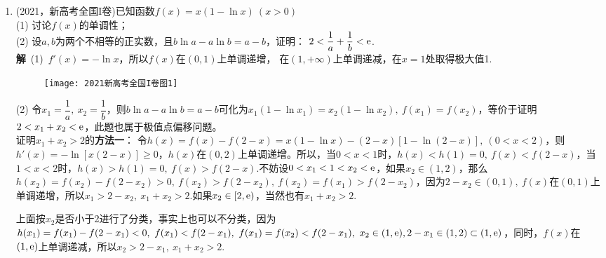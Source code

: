 \begin{enumerate}[label={【\textbf{例\thechapter.\arabic*}】},
 leftmargin=\inteval{\myenumleftmargin}pt,
 itemsep=\inteval{\myenumitempsep}pt,
 itemindent=\inteval{\myenumitemindent}pt]
令$ \varphi(x)=x^{\frac{1}{x-1}}\ (x>1) $，
$ \ln\varphi(x)=\dfrac{\ln x}{x-1} $，两边求导，
\begin{gather*}
    \frac{\varphi'(x)}{\varphi(x)}=
    \dfrac{1-\frac{1}{x}-\ln x}{(x-1)^2},\q 
    \varphi'(x)=x^{\frac{1}{x-1}} 
    \dfrac{1-\frac{1}{x}-\ln x}{(x-1)^2} 
\end{gather*}
容易证明，$ \dfrac{1}{x}+\ln x $在$ (0,+\infty) $上的极小值是1(当$ x=1 $)，
所以，$ \varphi'(x)<0 $，$ \varphi(x) $在
$ (1,+\infty) $上单调递减。$ n\geq 2,\ x_0=\varphi(n)\leq 
\varphi(2)=2 $. 另外，$ \lim\limits_{n\to+\infty}n^{\frac{1}{n-1}}=1 $.\\
\textbf{注2}\ 请读者自行证明：当$ n\geq 3 $时，$ x_0<x_1+x_2<2 $. \\
提示：要证$ x_1+x_2<2 $，只需证$ x>1 $时，$ f(x)<f(2-x) $；
要证$ 0<x_1+x_2 $，可考虑抛物线$ y=\dfrac{n-1}{x_0-1}x(x_0-x) $，
这条抛物线过原点、$ P(x_0,0) $点和$ f(x) $的极大值点$ (1,n-1) $.

\item (2021，新高考全国I卷)已知函数$ f(x)=x(1-\ln x)\ (x>0) $ \\
(1) 讨论$ f(x) $的单调性；\\
(2) 设$ a,b $为两个不相等的正实数，且$ b\ln a-a\ln b=a-b $，证明：
$ 2< \dfrac{1}{a}+\dfrac{1}{b}<\mathrm{e} $.\\
\textbf{解}\ (1)\ $ f'(x)=-\ln x $，所以$ f(x) $在$ (0,1) $上单调递增，
在$ (1,+\infty) $上单调递减，在$ x=1 $处取得极大值1.
\begin{figure}[H]
	\centering
	\texttt{[image: 2021新高考全国I卷图1]}
\end{figure} 
\noindent (2) 令$ x_1=\dfrac{1}{a},\ x_2=\dfrac{1}{b} $，则$ b\ln a-a\ln b=a-b $可化为$ x_1(1-\ln x_1)=x_2(1-\ln x_2),\ f(x_1)=f(x_2) $，等价于证明$ 2<x_1+x_2<\mathrm{e} $，此题也属于极值点偏移问题。\\
证明$ x_1+x_2>2 $的\textbf{方法一}：
令$ h(x)=f(x)-f(2-x)=x(1-\ln x)-(2-x)[1-\ln(2-x)],\ (0<x<2) $，则$ h'(x)=-\ln[x(2-x)]\geq 0 $，$ h(x) $在$ (0,2) $上单调递增。所以，当$ 0<x<1 $时，$ h(x)<h(1)=0,\ f(x)<f(2-x) $，当$ 1<x<2 $时，$ h(x)>h(1)=0,\ f(x)>f(2-x) $.不妨设$ 0<x_1<1<x_2<\mathrm{e} $，如果$ x_2\in(1,2) $，那么$ h(x_2)=f(x_2)-f(2-x_2)>0,\ f(x_2)>f(2-x_2),\ f(x_2)=f(x_1)>f(2-x_2) $，因为$ 2-x_2\in(0,1),\  f(x) $在$ (0,1) $上单调递增，所以$ x_1>2-x_2,\ x_1+x_2 >2 $.如果$ x_2\in[2,\mathrm{e}) $，当然也有$ x_1+x_2 >2 $.

上面按$ x_2 $是否小于2进行了分类，事实上也可以不分类，因为
$ h(x_1)=f(x_1)-f(2-x_1)<0,\ f(x_1)<f(2-x_1),\ f(x_1)=f(x_2)<f(2-x_1),\ x_2\in (1,\e), 2-x_1\in (1,2)\subset(1,\e) $，同时，$ f(x) $在$ (1,\mathrm{e}) $上单调递减，所以$ x_2>2-x_1,\ x_1+x_2 >2 $.


\end{enumerate}
